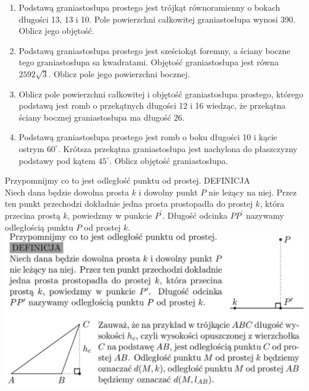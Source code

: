\documentclass[10pt]{article}
\begin{document}
\begin{enumerate}
  \item Podstawą graniastosłupa prostego jest trójkąt równoramienny o bokach długości 13, 13 i 10. Pole powierzchni całkowitej graniastosłupa wynosi 390. Oblicz jego objętość.
  \item Podstawą graniastosłupa prostego jest sześciokąt foremny, a ściany boczne tego graniastosłupa sa kwadratami. Objętość graniastosłupa jest równa \(2592 \sqrt{3}\). Oblicz pole jego powierzchni bocznej.
  \item Oblicz pole powierzchni całkowitej i objętość graniastosłupa prostego, którego podstawą jest romb o przekątnych długości 12 i 16 wiedząc, że przekątna ściany bocznej graniastosłupa ma długość 26.
  \item Podstawą graniastosłupa prostego jest romb o boku długości 10 i kącie ostrym \(60^{\circ}\). Krótsza przekątna graniastosłupa jest nachylona do płaszczyzny podstawy pod kątem \(45^{\circ}\). Oblicz objętość graniastosłupa.
\end{enumerate}

Przypomnijmy co to jest odległość punktu od prostej. DEFINICJA\\
Niech dana będzie dowolna prosta \(k\) i dowolny punkt \(P\) nie leżący na niej. Przez ten punkt przechodzi dokładnie jedna prosta prostopadła do prostej \(k\), która przecina prostą \(k\), powiedzmy w punkcie \(P^{\prime}\). Długość odcinka \(P P^{\prime}\) nazywamy odległością punktu \(P\) od prostej \(k\).\\
\includegraphics[max width=\textwidth, center]{2024_11_21_e9b4faa005d5be2cc318g-082(1)}
\end{document}
